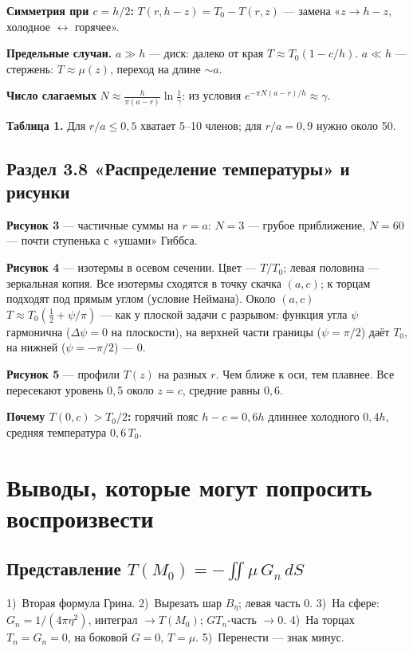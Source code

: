 \documentclass[a4paper,12pt]{article}
\renewcommand{\le}{\leqslant}
\begin{document}
\textbf{Симметрия при $c=h/2$:} $T(r,h-z)=T_0-T(r,z)$ — замена
«$z\to h-z$, холодное $\leftrightarrow$ горячее».

\textbf{Предельные случаи.} $a\gg h$ — диск: далеко от края
$T\approx T_0(1-c/h)$. $a\ll h$ — стержень: $T\approx\mu(z)$, переход на
длине $\sim a$.

\textbf{Число слагаемых} $N\approx\frac{h}{\pi(a-r)}\ln\frac1\gamma$:
из условия $e^{-\pi N(a-r)/h}\approx\gamma$.

\textbf{Таблица 1.} Для $r/a\le0{,}5$ хватает 5–10 членов; для $r/a=0{,}9$
нужно около 50.

\subsection{Раздел 3.8 «Распределение температуры» и рисунки}

\textbf{Рисунок 3} — частичные суммы на $r=a$: $N=3$ — грубое
приближение, $N=60$ — почти ступенька с «ушами» Гиббса.

\textbf{Рисунок 4} — изотермы в осевом сечении. Цвет — $T/T_0$; левая
половина — зеркальная копия. Все изотермы сходятся в точку скачка
$(a,c)$; к торцам подходят под прямым углом (условие Неймана). Около
$(a,c)$ $T\approx T_0(\frac12+\psi/\pi)$ — как у плоской задачи с
разрывом: функция угла $\psi$ гармонична ($\Delta\psi=0$ на плоскости),
на верхней части границы ($\psi=\pi/2$) даёт $T_0$, на нижней
($\psi=-\pi/2$) — 0.

\textbf{Рисунок 5} — профили $T(z)$ на разных $r$. Чем ближе к оси, тем
плавнее. Все пересекают уровень $0{,}5$ около $z=c$, средние равны
$0{,}6$.

\textbf{Почему $T(0,c)>T_0/2$:} горячий пояс $h-c=0{,}6h$ длиннее
холодного $0{,}4h$, средняя температура $0{,}6\,T_0$.

\section{Выводы, которые могут попросить воспроизвести}
\label{sec:derivations}

\subsection{Представление \texorpdfstring{$T(M_0)=-\iint\mu\,G_n\,dS$}{T(M0)}}
\label{der:rep}
1)~Вторая формула Грина. 2)~Вырезать шар $B_\eta$; левая часть 0.
3)~На сфере: $G_n=1/(4\pi\eta^2)$, интеграл $\to T(M_0)$; $GT_n$-часть
$\to0$. 4)~На торцах $T_n=G_n=0$, на боковой $G=0$, $T=\mu$.
5)~Перенести — знак минус.
\end{document}
